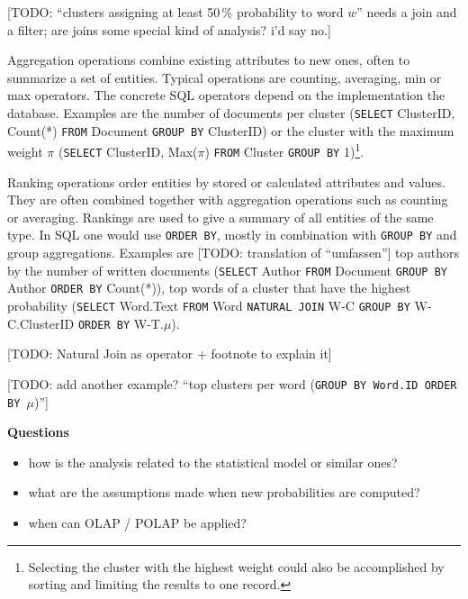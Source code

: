 [TODO: ``clusters assigning at least 50\,\% probability to word $w$'' needs a join and a filter; are joins some special kind of analysis? i'd say no.]

Aggregation operations combine existing attributes to new ones, often to summarize a set of entities. Typical operations are counting, averaging, min or max operators. The concrete SQL operators depend on the implementation the database. Examples are the number of documents per cluster (\texttt{SELECT} ClusterID, Count(*) \texttt{FROM} Document \texttt{GROUP BY} ClusterID) or the cluster with the maximum weight $\pi$ (\texttt{SELECT} ClusterID, Max($\pi$) \texttt{FROM} Cluster \texttt{GROUP BY} 1)\footnote{Selecting the cluster with the highest weight could also be accomplished by sorting and limiting the results to one record.}.

Ranking operations order entities by stored or calculated attributes and values. They are often combined together with aggregation operations such as counting or averaging. Rankings are used to give a summary of all entities of the same type. In SQL one would use \texttt{ORDER BY}, mostly in combination with \texttt{GROUP BY} and group aggregations. Examples are [TODO: translation of ``umfassen''] top authors by the number of written documents (\texttt{SELECT} Author \texttt{FROM} Document \texttt{GROUP BY} Author \texttt{ORDER BY} Count(*)), top words of a cluster that have the highest probability (\texttt{SELECT} Word.Text \texttt{FROM} Word \texttt{NATURAL JOIN} W-C \texttt{GROUP BY} W-C.ClusterID \texttt{ORDER BY} W-T.$\mu$).

[TODO: Natural Join as operator + footnote to explain it]

[TODO: add another example? ``top clusters per word (\texttt{GROUP BY \textrm{Word.ID} ORDER BY $\mu$})'']

\textbf{Questions}
\begin{itemize}
\item how is the analysis related to the statistical model or similar ones?
\item what are the assumptions made when new probabilities are computed?
\item when can OLAP / POLAP be applied?
\end{itemize}
